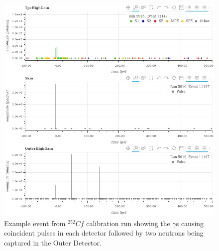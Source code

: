 \begin{figure}[]
\includegraphics[width=\textwidth]{Figures/NeutronCaptureTime/cf252_eventviewer_5916.png}
\centering
\caption{Example event from ${}^{252}{Cf}$ calibration run showing the $\gamma$s causing coincident pulses in each detector followed by two neutrons being captured in the Outer Detector.}
\label{fig:cf252_event_viewer}
\end{figure}

